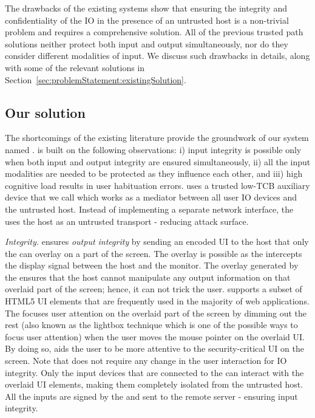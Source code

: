 The drawbacks of the existing systems show that ensuring the integrity and confidentiality of the IO in the presence of an untrusted host is a non-trivial problem and requires a comprehensive solution. All of the previous trusted path solutions neither protect both input and output simultaneously, nor do they consider different modalities of input. We discuss such drawbacks in details, along with some of the relevant solutions in Section~\ref{sec:problemStatement:existingSolution}.

 
\subsection{Our solution} The shortcomings of the existing literature provide the groundwork of our system named \name.
\name is built on the following observations: i) input integrity is possible only when both input and output integrity are ensured simultaneously, ii) all the input modalities are needed to be protected as they influence each other, and iii) high cognitive load results in user habituation errors. \name uses a trusted low-TCB auxiliary device that we call \device which works as a mediator between all user IO devices and the untrusted host. Instead of implementing a separate network interface, the \device uses the host as an untrusted transport - reducing attack surface.  

\emph{Integrity.} \name ensures \emph{output integrity} by sending an encoded UI to the host that only the \device can overlay on a part of the screen. The overlay is possible as the \device intercepts the display signal between the host and the monitor. The overlay generated by the \device ensures that the host cannot manipulate any output information on that overlaid part of the screen; hence, it can not trick the user. \device supports a subset of HTML5 UI elements that are frequently used in the majority of web applications. The \device focuses user attention on the overlaid part of the screen by dimming out the rest (also known as the lightbox technique which is one of the possible ways to focus user attention) when the user moves the mouse pointer on the overlaid UI. By doing so, \name aids the user to be more attentive to the security-critical UI on the screen. Note that \name does not require any change in the user interaction for IO integrity. Only the input devices that are connected to the \device can interact with the overlaid UI elements, making them completely isolated from the untrusted host. All the inputs are signed by the \device and sent to the remote server - ensuring input integrity.

